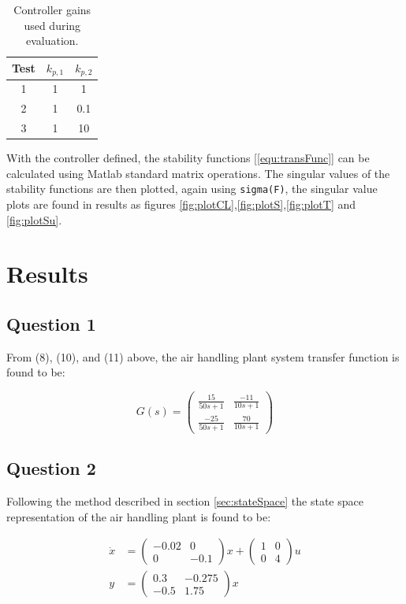 \documentclass[a4paper, titlepage]{article}
\begin{document}
\begin{table}[h!]
\begin{center}
\begin{tabular}{||c | c c||}
 \hline
 Test & $k_{p,1}$ & $k_{p,2}$ \\ [0.5ex] 
 \hline\hline
 1 &  1 & 1 \\ 
 \hline
 2 &  1 & 0.1 \\
 \hline
 3 &  1 & 10 \\
 \hline
\end{tabular}
\end{center}
\caption{Controller gains used during evaluation.}
\label{tab:gains}
\end{table}

With the controller defined, the stability functions [\ref{equ:transFunc}] can be calculated using Matlab standard matrix operations.
The singular values of the stability functions are then plotted, again using \verb|sigma(F)|, the singular value plots are found in results as figures \ref{fig:plotCL},\ref{fig:plotS},\ref{fig:plotT} and \ref{fig:plotSu}.

\section{Results}

\subsection{Question 1}
From (8), (10), and (11) above, the air handling plant system transfer function is found to be:

\begin{equation}
G(s)
=
\begin{pmatrix}
\frac{15}{50s + 1} & \frac{-11}{10s + 1} \\ \frac{-25}{50s + 1} & \frac{70}{10s + 1}
\end{pmatrix}
\label{equ:airPlantResult}
\end{equation}

\subsection{Question 2}
Following the method described in section \ref{sec:stateSpace} the state space representation of the air handling plant is found to be:

\begin{equation}
\begin{split}
\dot{x} &= 
\begin{pmatrix}
-0.02 & 0 \\ 0 & -0.1
\end{pmatrix}x
+
\begin{pmatrix}
1 & 0 \\ 0 & 4
\end{pmatrix}u \\
y &= 
\begin{pmatrix}
0.3 & -0.275 \\ -0.5 & 1.75
\end{pmatrix}x
\end{split}
\label{equ:ssSolution}
\end{equation}
\end{document}
